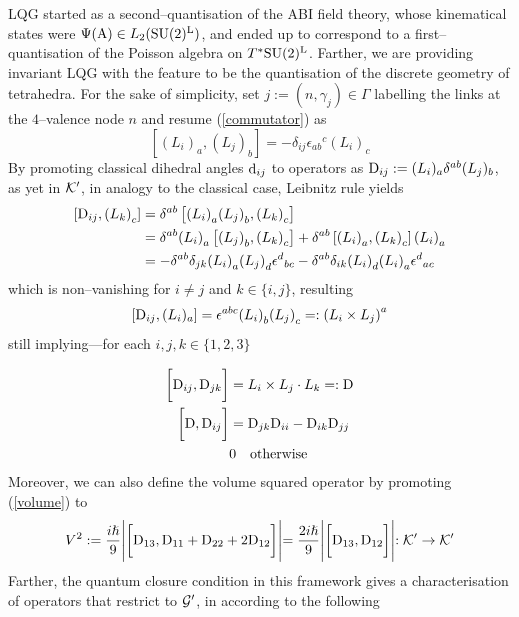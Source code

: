 LQG started as a second--quantisation of the ABI field theory, whose kinematical states were $\Psi(\text{\normalfont A})\in L_2(\text{\normalfont SU}(2)^{\text{\normalfont L}})$, and ended up to correspond to a first--quantisation of the Poisson algebra on $T^*\text{\normalfont SU}(2)^{\text{\normalfont L}}$. Farther, we are providing invariant LQG with the feature to be the quantisation of the discrete geometry of tetrahedra. For the sake of simplicity, set $j:=(n,\gamma_j)\in\Gamma$ labelling the links at the $4$--valence node $n$ and resume (\ref{commutator}) as
$$\left[{(L_i)}_a,{(L_j)}_b\right]=-\delta_{ij}{\epsilon_{ab}}^c{(L_i)}_c$$
By promoting classical dihedral angles $\text{\normalfont d}_{ij}$ to operators as $\text{\normalfont D}_{ij}:={(L_i)_a}\delta^{ab}{(L_j)_b}$, as yet in $\mathcal{K}'$, in analogy to the classical case, Leibnitz rule yields
\begin{align*}
    \left[\text{\normalfont D}_{ij},{(L_k)}_c\right]&=\delta^{ab}\left[{(L_i)}_a{(L_j)}_b,{(L_k)}_c\right]\\
    &=\delta^{ab}{(L_i)}_a\left[{(L_j)}_b,{(L_k)}_c\right]+\delta^{ab}\left[{(L_i)}_a,{(L_k)}_c\right]{(L_i)}_a\\
    &=-\delta^{ab}\delta_{jk}{(L_i)}_a{(L_j)}_d{\epsilon^d}_{bc}-\delta^{ab}\delta_{ik}{(L_i)}_d{(L_i)}_a{\epsilon^d}_{ac}
\end{align*}
{which is non--vanishing for $i\neq j$ and $k\in\{i,j\}$, resulting}
$$\left[\text{\normalfont D}_{ij},(L_i)_a\right]=\epsilon^{abc}{(L_i)}_b{(L_j)}_c=:\left(L_i\times L_j\right)^a$$
still implying---for each $i,j,k\in\{1,2,3\}$

\begin{equation}\label{commutation_dihedral_ops}
    \begin{split}
    \bigg[\text{\normalfont D}_{ij},\text{\normalfont D}_{jk}\bigg]&=L_i\times L_j\cdot L_k=:\text{\normalfont D}\\
    \bigg[\text{\normalfont D},\text{\normalfont D}_{ij}\bigg]&=\text{\normalfont D}_{jk}\text{\normalfont D}_{ii}-\text{\normalfont D}_{ik}\text{\normalfont D}_{jj}\\
    &0\quad\text{otherwise}
\end{split}
\end{equation}
Moreover, we can also define the volume squared operator by promoting (\ref{volume}) to 
\begin{equation}\label{volume_op}
    V^2:=\frac{i\hslash}{9}\Biggl|\bigg[\text{\normalfont D}_{13},\text{\normalfont D}_{11}+\text{\normalfont D}_{22}+2\text{\normalfont D}_{12}\bigg]\Biggl|=\frac{2i\hslash}{9}\Biggl|\bigg[\text{\normalfont D}_{13},\text{\normalfont D}_{12}\bigg]\Biggl|:\mathcal{K}'\to\mathcal{K}'
\end{equation}
Farther, the quantum closure condition in this framework gives a characterisation of operators that restrict to $\mathcal{G}'$, in according to the following

